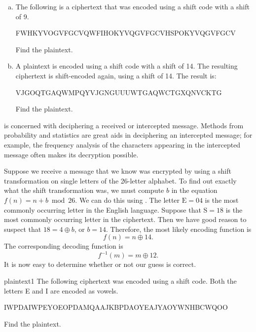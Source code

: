 \begin{exercise}{}  
\begin{enumerate}[(a)]
\item
The following is a ciphertext that was encoded using a shift code with a shift of 9.

FWHKYVOGVFGCVQWFIHOKYVQGVFGCVHSPOKYVQGVFGCV

\noindent
Find the plaintext.
\item
A plaintext is encoded using a shift code with a shift of 14. The resulting ciphertext is shift-encoded again, using a shift of 14. The result is:

VJGOQTGAQWMPQYVJGNGUUUWTGAQWCTGXQNVCKTG

\noindent
Find the plaintext.
\end{enumerate}
\end{exercise}

 is concerned with
deciphering a received or intercepted message. Methods from
probability and statistics are great aids in deciphering an
intercepted message; for example, the frequency analysis of the
characters appearing in the intercepted message often makes its
decryption possible.  
 
\begin{example}{2}
Suppose we receive a message that we know was encrypted by using a
shift transformation on single letters of the 26-letter alphabet. To
find out exactly what the shift transformation was, we must compute
$b$ in the equation $f(n) = n + b \bmod 26$. We can do this using
.  
The letter $\mbox{E} = 04$ is the most commonly
occurring letter in the English language. Suppose that $\mbox{S} = 18$
is the most commonly occurring letter in the ciphertext.  Then we have
good reason to suspect that  $18 = 4 \oplus b $, or $b= 14$.
Therefore, the most likely encoding function is
$$
f(n) = n \oplus 14.
$$
The corresponding decoding function is
$$
f^{-1}(m) = m \oplus 12.
$$
It is now easy to determine whether or not our guess is correct.
\end{example}
 
\begin{exercise}{plaintext1}  
The following ciphertext was encoded using a shift code. Both the letters E and I are encoded as vowels. 

IWPDAIWPEYOEOPDAMQAAJKBPDAOYEAJYAOYWNHBCWQOO

\noindent
Find the plaintext.
\end{exercise}

